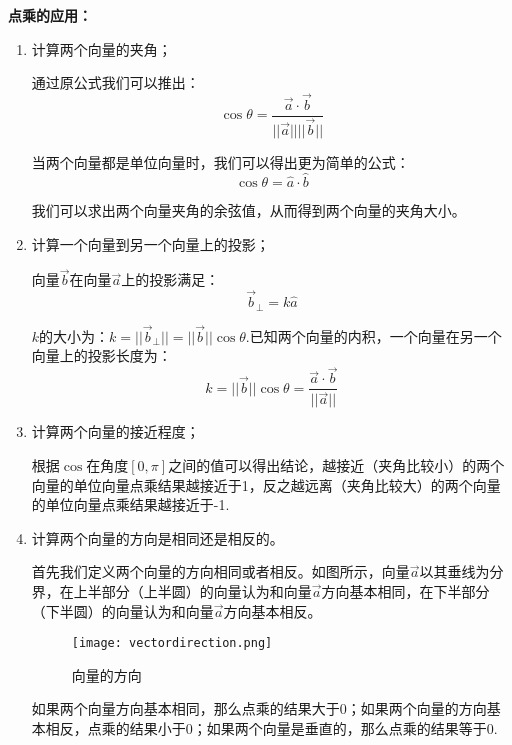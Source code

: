 \documentclass[openany]{progbookcn}
\begin{document}
\textbf{点乘的应用：}
\begin{enumerate}[1)]
	\item 计算两个向量的夹角；
	
	通过原公式我们可以推出：
	\begin{equation}
	\cos\theta=\frac{\overrightarrow{a}\cdot\overrightarrow{b}}{||\overrightarrow{a}||||\overrightarrow{b}||}
	\end{equation}

	当两个向量都是单位向量时，我们可以得出更为简单的公式：
	\begin{equation}
		\cos\theta=\hat{a}\cdot\hat{b}
	\end{equation}
	
	我们可以求出两个向量夹角的余弦值，从而得到两个向量的夹角大小。
	
	\item 计算一个向量到另一个向量上的投影；
	
	向量$\overrightarrow{b}$在向量$\overrightarrow{a}$上的投影满足：
	\begin{equation}
		\overrightarrow{b}_\perp=k\hat{a}
	\end{equation}

	$k$的大小为：$k = ||\overrightarrow{b}_\perp||=||\overrightarrow{b}||\cos\theta$.已知两个向量的内积，一个向量在另一个向量上的投影长度为：
	\begin{equation}
		k=||\overrightarrow{b}||\cos\theta=\frac{\overrightarrow{a}\cdot\overrightarrow{b}}{||\overrightarrow{a}||}
	\end{equation}

	\item 计算两个向量的接近程度；
	
	根据$\cos$在角度$[0,\pi]$之间的值可以得出结论，越接近（夹角比较小）的两个向量的单位向量点乘结果越接近于1，反之越远离（夹角比较大）的两个向量的单位向量点乘结果越接近于-1.
	
	\item 计算两个向量的方向是相同还是相反的。
	
	首先我们定义两个向量的方向相同或者相反。如图所示，向量$\overrightarrow{a}$以其垂线为分界，在上半部分（上半圆）的向量认为和向量$\overrightarrow{a}$方向基本相同，在下半部分（下半圆）的向量认为和向量$\overrightarrow{a}$方向基本相反。
	\begin{figure}[H]
		\centering
		\texttt{[image: vectordirection.png]}
		\caption{向量的方向}
		\label{fig:vectordir}
	\end{figure}

	如果两个向量方向基本相同，那么点乘的结果大于0；如果两个向量的方向基本相反，点乘的结果小于0；如果两个向量是垂直的，那么点乘的结果等于0.
	
	
\end{enumerate}
\end{document}
